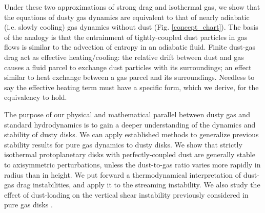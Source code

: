 \documentclass[iop, numberedappendix]{emulateapj}
\newcommand{\rhog}{\rho_\mathrm{g}}
\begin{document}

Under these two approximations of strong drag and isothermal gas, we show that the equations of 
 dusty gas dynamics are equivalent to that of nearly adiabatic (i.e. slowly cooling) gas
dynamics without dust (Fig. \ref{concept_chart}).  The basis of the analogy is that the entrainment 
of tightly-coupled dust particles in gas flows is similar to the advection
of entropy in an adiabatic fluid. %
Finite dust-gas drag act as effective heating/cooling: the relative
drift between dust and gas causes a fluid parcel to exchange dust
particles with its surroundings; an effect similar to heat exchange
between a gas parcel and its surroundings.   Needless to say the effective heating term must have a 
specific form, which we derive, for the equivalency to hold.


The purpose of our physical and mathematical parallel between
dusty gas and standard hydrodynamics is to gain a deeper understanding of the dynamics
and stability of dusty disks.  
We can apply established methods to generalize previous stability 
results for pure gas dynamics to dusty disks.  
We show that strictly isothermal protoplanetary disks with
perfectly-coupled dust are generally 
stable to axisymmetric perturbations, unless the 
dust-to-gas ratio varies more rapidly in radius than in height.  
We put forward a thermodynamical interpretation of 
dust-gas drag instabilities, and apply it to the streaming instability.   
We also study the effect of dust-loading on the vertical shear
instability previously considered in pure gas disks
\citep[VSI,][]{nelson13,lin15,barker15}.  
\end{document}
